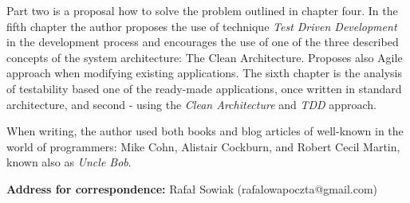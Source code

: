 Part two is a proposal how to solve the problem outlined in chapter four. In the fifth chapter the author proposes the use of technique \textit{Test Driven Development} in the development process and encourages the use of one of the three described concepts of the system architecture: The Clean Architecture. Proposes also Agile approach when modifying existing applications. The sixth chapter is the analysis of testability based one of the ready-made applications, once written in standard architecture, and second - using the \textit{Clean Architecture} and \textit{TDD} approach.

When writing, the author used both books and blog articles of well-known in the world of programmers: Mike Cohn, Alistair Cockburn, and Robert Cecil Martin, known also as \textit{Uncle Bob}.

\textbf{Address for correspondence:}
Rafał Sowiak (rafalowapoczta@gmail.com)


